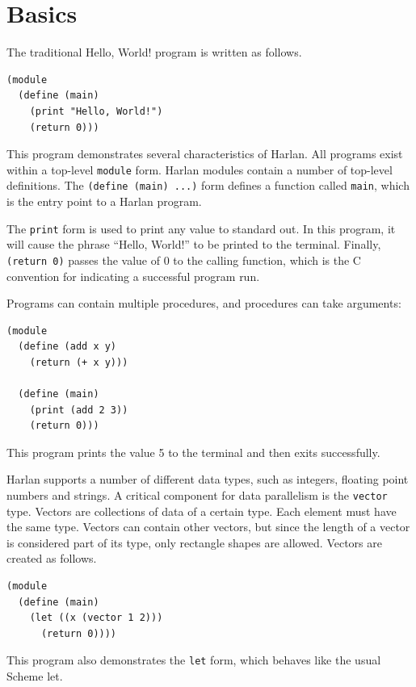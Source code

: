 \documentclass[oneside]{report}
\begin{document}
\section{Basics}

The traditional Hello, World! program is written as follows.

\begin{lstlisting}
(module
  (define (main)
    (print "Hello, World!")
    (return 0)))
\end{lstlisting}

This program demonstrates several characteristics of Harlan. All
programs exist within a top-level \lstinline{module} form. Harlan
modules contain a number of top-level definitions. The
\lstinline{(define (main) ...)} form defines a function called
\lstinline{main}, which is the entry point to a Harlan program.

The \lstinline{print} form is used to print any value to standard
out. In this program, it will cause the phrase ``Hello, World!'' to be
printed to the terminal. Finally, \lstinline{(return 0)} passes the
value of 0 to the calling function, which is the C convention for
indicating a successful program run.

Programs can contain multiple procedures, and procedures can take
arguments:

\begin{lstlisting}
(module
  (define (add x y)
    (return (+ x y)))

  (define (main)
    (print (add 2 3))
    (return 0)))
\end{lstlisting}

This program prints the value 5 to the terminal and then exits
successfully.

Harlan supports a number of different data types, such as integers,
floating point numbers and strings. A critical component for data
parallelism is the \lstinline{vector} type. Vectors are collections of
data of a certain type. Each element must have the same type. Vectors
can contain other vectors, but since the length of a vector is
considered part of its type, only rectangle shapes are
allowed. Vectors are created as follows.

\begin{lstlisting}
(module
  (define (main)
    (let ((x (vector 1 2)))
      (return 0))))
\end{lstlisting}

This program also demonstrates the \lstinline{let} form, which behaves
like the usual Scheme let.
\end{document}
